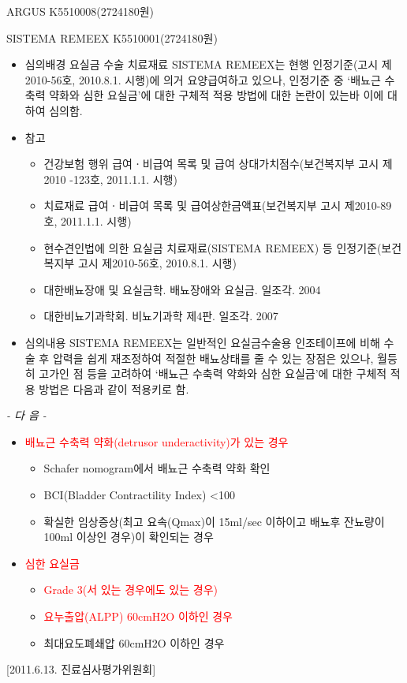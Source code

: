 ARGUS K5510008(2724180원) \par
SISTEMA REMEEX K5510001(2724180원)\par
{}
\begin{itemize}[■]\tightlist
\item 심의배경 \newline
요실금 수술 치료재료 SISTEMA REMEEX는 현행 인정기준(고시 제2010-56호, 2010.8.1. 시행)에 의거 요양급여하고 있으나, 인정기준 중 ‘배뇨근 수축력 약화와 심한 요실금’에 대한 구체적 적용 방법에 대한 논란이 있는바 이에 대하여 심의함.
\item 참고 
	\begin{itemize}[○]\tightlist
	\item 건강보험 행위 급여ㆍ비급여 목록 및 급여 상대가치점수(보건복지부 고시 제2010 -123호, 2011.1.1. 시행)
	\item 치료재료 급여ㆍ비급여 목록 및 급여상한금액표(보건복지부 고시 제2010-89호, 2011.1.1. 시행)
	\item 현수견인법에 의한 요실금 치료재료(SISTEMA REMEEX) 등 인정기준(보건복지부 고시 제2010-56호, 2010.8.1. 시행)
	\item 대한배뇨장애 및 요실금학. 배뇨장애와 요실금. 일조각. 2004
	\item 대한비뇨기과학회. 비뇨기과학 제4판. 일조각. 2007
	\end{itemize}
\item 심의내용 \newline
SISTEMA REMEEX는 일반적인 요실금수술용 인조테이프에 비해 수술 후 압력을 쉽게 재조정하여 적절한 배뇨상태를 줄 수 있는 장점은 있으나, 월등히 고가인 점 등을 고려하여 ‘배뇨근 수축력 약화와 심한 요실금’에 대한 구체적 적용 방법은 다음과 같이 적용키로 함.
\end{itemize}
\begin{center}\emph{- 다 음 -}\end{center}
\begin{itemize}[○]\tightlist
\item \textcolor{red}{배뇨근 수축력 약화(detrusor underactivity)가 있는 경우 }
	\begin{itemize}[-]\tightlist
	\item Schafer nomogram에서 배뇨근 수축력 약화 확인 
	\item BCI(Bladder Contractility Index) <100 
	\item 확실한 임상증상(최고 요속(Qmax)이 15ml/sec 이하이고 배뇨후 잔뇨량이 100ml 이상인 경우)이 확인되는 경우
	\end{itemize}
\item \textcolor{red}{심한 요실금} 
	\begin{itemize}[-]\tightlist
	\item \textcolor{red}{Grade 3(서 있는 경우에도 있는 경우)}
	\item \textcolor{red}{요누출압(ALPP) 60cmH2O 이하인 경우}
	\item 최대요도폐쇄압 60cmH2O 이하인 경우
	\end{itemize}
\end{itemize}
[2011.6.13. 진료심사평가위원회]

